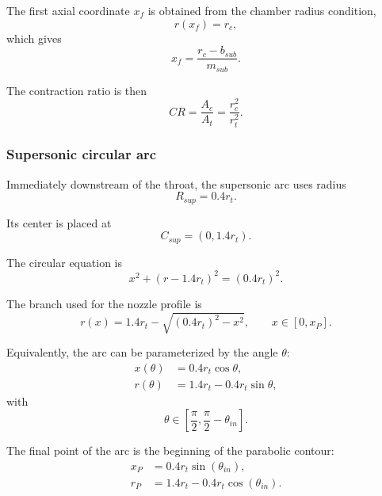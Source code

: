 \documentclass[journal,article,submit,oneauthor]{Definitions/mdpi}
\begin{document}
The first axial coordinate $x_f$ is obtained from the chamber radius condition,
\begin{equation}
r(x_f)=r_c,
\end{equation}
which gives
\begin{equation}
x_f=\frac{r_c-b_{sub}}{m_{sub}} .
\label{eq:xf}
\end{equation}

The contraction ratio is then
\begin{equation}
CR=\frac{A_c}{A_t}=\frac{r_c^2}{r_t^2}.
\label{eq:contraction_ratio}
\end{equation}

\subsubsection{Supersonic circular arc}

Immediately downstream of the throat, the supersonic arc uses radius
\begin{equation}
R_{sup}=0.4r_t.
\end{equation}

Its center is placed at
\begin{equation}
C_{sup}=(0,1.4r_t).
\end{equation}

The circular equation is
\begin{equation}
x^2+(r-1.4r_t)^2=(0.4r_t)^2.
\end{equation}

The branch used for the nozzle profile is
\begin{equation}
r(x)=1.4r_t-\sqrt{(0.4r_t)^2-x^2},
\qquad x\in[0,x_P].
\label{eq:sup_arc}
\end{equation}

Equivalently, the arc can be parameterized by the angle $\theta$:
\begin{align}
x(\theta)&=0.4r_t\cos\theta,\\
r(\theta)&=1.4r_t-0.4r_t\sin\theta,
\end{align}
with
\begin{equation}
\theta\in\left[\frac{\pi}{2},\frac{\pi}{2}-\theta_{in}\right].
\end{equation}

The final point of the arc is the beginning of the parabolic contour:
\begin{align}
x_P &=0.4r_t\sin(\theta_{in}),
\label{eq:xP}\\
r_P &=1.4r_t-0.4r_t\cos(\theta_{in}).
\label{eq:yP}
\end{align}
\end{document}

